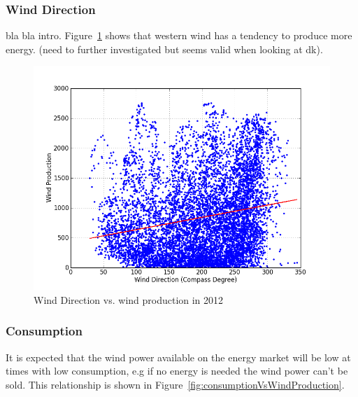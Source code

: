 \subsubsection{Wind Direction}
bla bla intro. Figure~\ref{fig:windDirVsProd} shows that western wind has a tendency to produce more energy. (need to further investigated but seems valid when looking at dk).
\begin{figure}[H]
\centering
\includegraphics[width=0.99\linewidth,natwidth=898,natheight=587]{billeder/productionVsWindDirection.png}
\caption{Wind Direction vs. wind production in 2012}
\label{fig:windDirVsProd}
\end{figure}

\subsubsection{Consumption}
It is expected that the wind power available on the energy market will be low at times with low consumption, e.g if no energy is needed the wind power can't be sold.  This relationship is shown in Figure~\ref{fig:consumptionVsWindProduction}.

